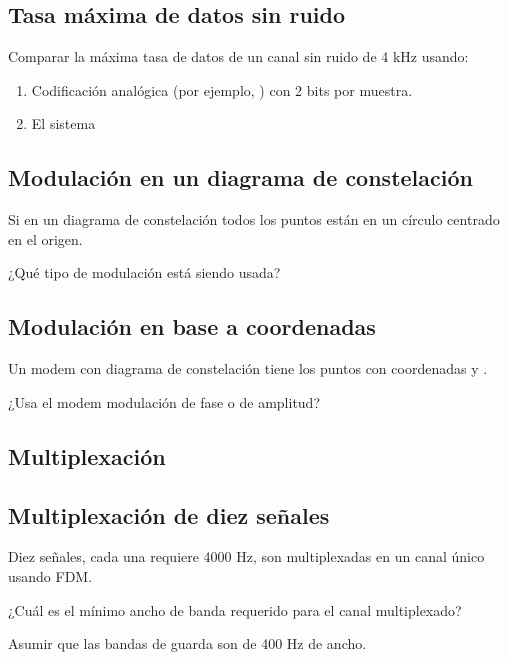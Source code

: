 \documentclass[12pt]{report}
\begin{document}
\begin{exer}
\subsection{Tasa máxima de datos sin ruido \sthree}
Comparar la máxima tasa de datos de un canal sin ruido de 4 kHz usando:

\begin{enumerate}
\item Codificación analógica (por ejemplo, ) con 2 bits por muestra.
\item El sistema 
\end{enumerate}
\end{exer}

\begin{exer}
\subsection{Modulación en un diagrama de constelación \sthree \steo}
Si en un diagrama de constelación todos los puntos están en un círculo centrado en el origen.

¿Qué tipo de modulación está siendo usada?
\end{exer}

\begin{exer}
\subsection{Modulación en base a coordenadas \stwo \steo}
Un modem con diagrama de constelación tiene los puntos con coordenadas  y
.

¿Usa el modem modulación de fase o de amplitud?
\end{exer}

\begin{exer}
\section{Multiplexación}
\subsection{Multiplexación de diez señales \sthree}
Diez señales, cada una requiere 4000 Hz, son multiplexadas en un canal único usando FDM.

¿Cuál es el mínimo ancho de banda requerido para el canal multiplexado?

Asumir que las bandas de guarda son de 400 Hz de ancho. 
\end{exer}
\end{document}
